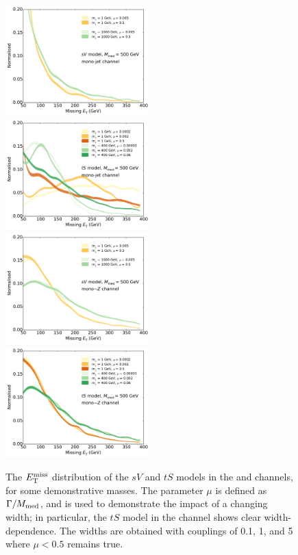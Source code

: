 \begin{figure}[t]
  \begin{center}
    \includegraphics[width=0.495\textwidth]{figures/MET_monojet_SVD.pdf}
    \includegraphics[width=0.495\textwidth]{figures/MET_monojet_TSD.pdf}
    \includegraphics[width=0.495\textwidth]{figures/MET_monoZ_SVD.pdf}
    \includegraphics[width=0.495\textwidth]{figures/MET_monoZ_TSD.pdf}
    \caption{The $E_{\mathrm{T}}^{\mathrm{miss}}$ distribution of the $sV$ and $tS$ models in the \monojet and \monoZ channels, for some demonstrative masses. The parameter $\mu$ is defined as $\Gamma / M_{\mathrm{med}}$, and is used to demonstrate the impact of a changing width; in particular, the $tS$ model in the \monojet channel shows clear width-dependence. The widths are obtained with couplings of 0.1, 1, and 5 where $\mu < 0.5$ remains true.}
    \label{fig:MET_dists}
  \end{center}
\end{figure}

